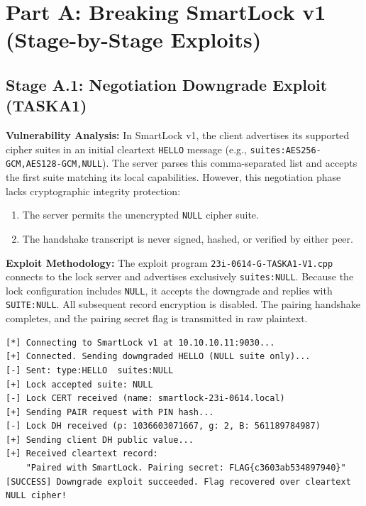 \documentclass[11pt,a4paper]{article}
\begin{document}
\section{Part A: Breaking SmartLock v1 (Stage-by-Stage Exploits)}

\subsection{Stage A.1: Negotiation Downgrade Exploit (TASKA1)}
\textbf{Vulnerability Analysis:}  
In SmartLock v1, the client advertises its supported cipher suites in an initial cleartext \texttt{HELLO} message (e.g., \texttt{suites:AES256-GCM,AES128-GCM,NULL}). The server parses this comma-separated list and accepts the first suite matching its local capabilities. However, this negotiation phase lacks cryptographic integrity protection:
\begin{enumerate}
    \item The server permits the unencrypted \texttt{NULL} cipher suite.
    \item The handshake transcript is never signed, hashed, or verified by either peer.
\end{enumerate}

\textbf{Exploit Methodology:}  
The exploit program \texttt{23i-0614-G-TASKA1-V1.cpp} connects to the lock server and advertises exclusively \texttt{suites:NULL}. Because the lock configuration includes \texttt{NULL}, it accepts the downgrade and replies with \texttt{SUITE:NULL}. All subsequent record encryption is disabled. The pairing handshake completes, and the pairing secret flag is transmitted in raw plaintext.

\begin{lstlisting}[caption={Stage A.1 Terminal Output (\texttt{23i-0614-G-TASKA1-V1})}]
[*] Connecting to SmartLock v1 at 10.10.10.11:9030...
[+] Connected. Sending downgraded HELLO (NULL suite only)...
[-] Sent: type:HELLO  suites:NULL
[+] Lock accepted suite: NULL
[-] Lock CERT received (name: smartlock-23i-0614.local)
[+] Sending PAIR request with PIN hash...
[-] Lock DH received (p: 1036603071667, g: 2, B: 561189784987)
[+] Sending client DH public value...
[+] Received cleartext record:
    "Paired with SmartLock. Pairing secret: FLAG{c3603ab534897940}"
[SUCCESS] Downgrade exploit succeeded. Flag recovered over cleartext NULL cipher!
\end{lstlisting}
\end{document}
